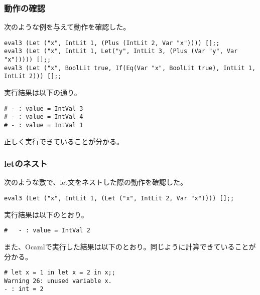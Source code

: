 \documentclass[a4paper,9pt]{jarticle}
\begin{document}
\subsubsection{動作の確認}
次のような例を与えて動作を確認した。

\begin{lstlisting}
eval3 (Let ("x", IntLit 1, (Plus (IntLit 2, Var "x")))) [];;
eval3 (Let ("x", IntLit 1, Let("y", IntLit 3, (Plus (Var "y", Var "x"))))) [];;
eval3 (Let ("x", BoolLit true, If(Eq(Var "x", BoolLit true), IntLit 1, IntLit 2))) [];;
\end{lstlisting}

実行結果は以下の通り。
\begin{lstlisting}
# - : value = IntVal 3
# - : value = IntVal 4
# - : value = IntVal 1
\end{lstlisting}
正しく実行できていることが分かる。

\subsubsection{letのネスト}
次のような敷で、let文をネストした際の動作を確認した。
\begin{lstlisting}
eval3 (Let ("x", IntLit 1, (Let ("x", IntLit 2, Var "x")))) [];;
\end{lstlisting}
実行結果は以下のとおり。
\begin{lstlisting}
#   - : value = IntVal 2
\end{lstlisting}

また、Ocamlで実行した結果は以下のとおり。同じように計算できていることが
分かる。
\begin{lstlisting}
# let x = 1 in let x = 2 in x;;
Warning 26: unused variable x.
- : int = 2
\end{lstlisting}
\end{document}
